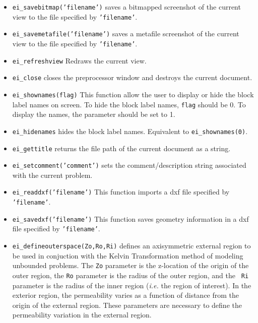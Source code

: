 \begin{itemize}
\item \texttt{ei\_savebitmap('filename')} saves a bitmapped screenshot of the current
view to the file specified by \texttt{'filename'}.

\item \texttt{ei\_savemetafile('filename')} saves a metafile screenshot of the current
view to the file specified by \texttt{'filename'}.

\item \texttt{ei\_refreshview} Redraws the current view.

\item \texttt{ei\_close} closes the preprocessor window and
destroys the current document.

\item \texttt{ei\_shownames(flag)} This function allow the user to display or hide the
block label names on screen. To hide the block label names,
\texttt{flag} should be 0. To display the names, the parameter
should be set to 1.

\item{\tt ei\_hidenames} hides the block label names. Equivalent to {\tt ei\_shownames(0)}.

\item{\tt ei\_gettitle} returns the file path of the current document as a string.

\item{\tt ei\_setcomment('comment')} sets the comment/description string associated with the current problem.

\item{\tt ei\_readdxf('filename')} This function imports a dxf file specified by {\tt 'filename'}.

\item{\tt ei\_savedxf('filename')} This function saves geometry information in a dxf file specified by {\tt 'filename'}.

\item{\tt ei\_defineouterspace(Zo,Ro,Ri)} defines
an axisymmetric external region to be used in conjuction with the
Kelvin Transformation method of modeling unbounded problems.  The
{\tt Zo} parameter is the z-location of the origin of the outer region,
the {\tt Ro} parameter is the radius of the outer region, and the {\tt
Ri} parameter is the radius of the inner region ({\em i.e.} the region of
interest). In the exterior region, the permeability varies as a function of
distance from the origin of the external region.  These parameters
are necessary to define the permeability variation in the external
region.


\end{itemize}
